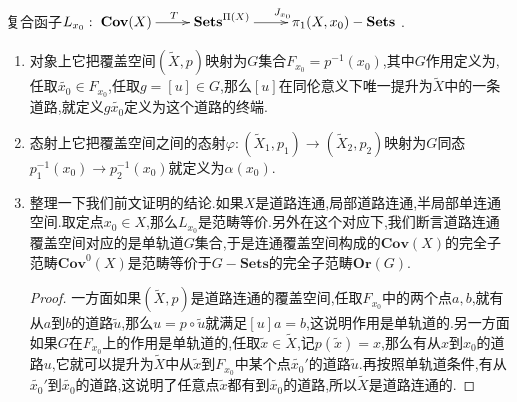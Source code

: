 复合函子$L_{x_0}:\xymatrix{\textbf{Cov}(X)\ar[r]^T&\textbf{Sets}^{\Pi(X)}\ar[r]^{J_{x_0}}&\pi_1(X,x_0)-\textbf{Sets}}$.
\begin{enumerate}
	\item 对象上它把覆盖空间$(\widetilde{X},p)$映射为$G$集合$F_{x_0}=p^{-1}(x_0)$,其中$G$作用定义为,任取$\widetilde{x_0}\in F_{x_0}$,任取$g=[u]\in G$,那么$[u]$在同伦意义下唯一提升为$\widetilde{X}$中的一条道路,就定义$g\widetilde{x_0}$定义为这个道路的终端.
	\item 态射上它把覆盖空间之间的态射$\varphi:(\widetilde{X}_1,p_1)\to(\widetilde{X}_2,p_2)$映射为$G$同态$p^{-1}_1(x_0)\to p_2^{-1}(x_0)$就定义为$\alpha(x_0)$.
	\item 整理一下我们前文证明的结论.如果$X$是道路连通,局部道路连通,半局部单连通空间.取定点$x_0\in X$,那么$L_{x_0}$是范畴等价.另外在这个对应下,我们断言道路连通覆盖空间对应的是单轨道$G$集合,于是连通覆盖空间构成的$\textbf{Cov}(X)$的完全子范畴$\textbf{Cov}^0(X)$是范畴等价于$G-\textbf{Sets}$的完全子范畴$\textbf{Or}(G)$.
    \begin{proof}
    	
    	一方面如果$(\widetilde{X},p)$是道路连通的覆盖空间,任取$F_{x_0}$中的两个点$a,b$,就有从$a$到$b$的道路$\widetilde{u}$,那么$u=p\circ\widetilde{u}$就满足$[u]a=b$,这说明作用是单轨道的.另一方面如果$G$在$F_{x_0}$上的作用是单轨道的,任取$\widetilde{x}\in\widetilde{X}$,记$p(\widetilde{x})=x$,那么有从$x$到$x_0$的道路$u$,它就可以提升为$\widetilde{X}$中从$\widetilde{x}$到$F_{x_0}$中某个点$\widetilde{x_0}'$的道路$\widetilde{u}$.再按照单轨道条件,有从$\widetilde{x_0}'$到$\widetilde{x_0}$的道路,这说明了任意点$\widetilde{x}$都有到$\widetilde{x_0}$的道路,所以$\widetilde{X}$是道路连通的.
    \end{proof}
\end{enumerate}

